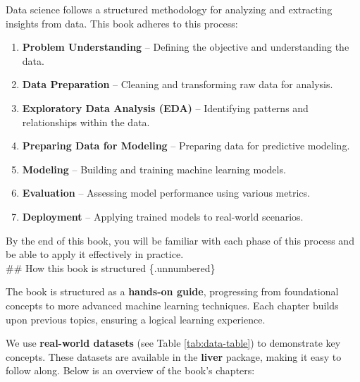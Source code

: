 \documentclass[
]{book}
\providecommand{\tightlist}{%
  \setlength{\itemsep}{0pt}\setlength{\parskip}{0pt}}
\theoremstyle{definition}
\theoremstyle{definition}
\theoremstyle{definition}
\theoremstyle{definition}
\theoremstyle{remark}
\begin{document}
Data science follows a structured methodology for analyzing and extracting insights from data. This book adheres to this process:

\begin{enumerate}
\def\labelenumi{\arabic{enumi}.}
\tightlist
\item
  \textbf{Problem Understanding} -- Defining the objective and understanding the data.\\
\item
  \textbf{Data Preparation} -- Cleaning and transforming raw data for analysis.\\
\item
  \textbf{Exploratory Data Analysis (EDA)} -- Identifying patterns and relationships within the data.\\
\item
  \textbf{Preparing Data for Modeling} -- Preparing data for predictive modeling.\\
\item
  \textbf{Modeling} -- Building and training machine learning models.\\
\item
  \textbf{Evaluation} -- Assessing model performance using various metrics.\\
\item
  \textbf{Deployment} -- Applying trained models to real-world scenarios.
\end{enumerate}

By the end of this book, you will be familiar with each phase of this process and be able to apply it effectively in practice.\\
\#\# How this book is structured \{.unnumbered\}

The book is structured as a \textbf{hands-on guide}, progressing from foundational concepts to more advanced machine learning techniques. Each chapter builds upon previous topics, ensuring a logical learning experience.

We use \textbf{real-world datasets} (see Table \ref{tab:data-table}) to demonstrate key concepts. These datasets are available in the \textbf{liver} package, making it easy to follow along. Below is an overview of the book's chapters:
\end{document}

